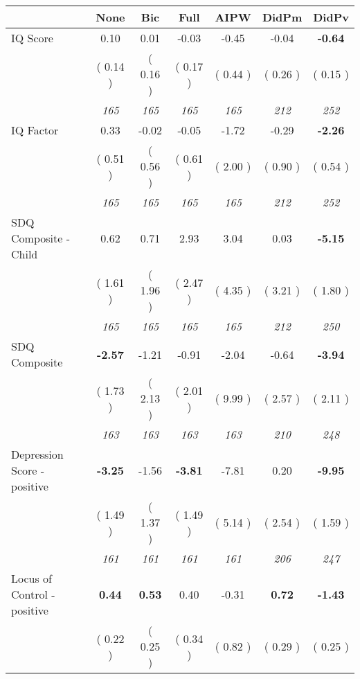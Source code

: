 \begin{tabular}{l c c c c c c}
\toprule
 & None & Bic & Full & AIPW & DidPm & DidPv \\
\midrule
IQ Score &      0.10 &      0.01 &     -0.03 &     -0.45 &     -0.04 & \textbf{     -0.64 } \\
& (     0.14 ) & (     0.16 ) & (     0.17 ) & (     0.44 ) & (     0.26 ) & (     0.15 ) \\
& \textit{ 165 } & \textit{ 165 } & \textit{ 165 } & \textit{ 165 } & \textit{ 212 } & \textit{ 252 } \\
IQ Factor &      0.33 &     -0.02 &     -0.05 &     -1.72 &     -0.29 & \textbf{     -2.26 } \\
& (     0.51 ) & (     0.56 ) & (     0.61 ) & (     2.00 ) & (     0.90 ) & (     0.54 ) \\
& \textit{ 165 } & \textit{ 165 } & \textit{ 165 } & \textit{ 165 } & \textit{ 212 } & \textit{ 252 } \\
SDQ Composite - Child &      0.62 &      0.71 &      2.93 &      3.04 &      0.03 & \textbf{     -5.15 } \\
& (     1.61 ) & (     1.96 ) & (     2.47 ) & (     4.35 ) & (     3.21 ) & (     1.80 ) \\
& \textit{ 165 } & \textit{ 165 } & \textit{ 165 } & \textit{ 165 } & \textit{ 212 } & \textit{ 250 } \\
SDQ Composite & \textbf{     -2.57 } &     -1.21 &     -0.91 &     -2.04 &     -0.64 & \textbf{     -3.94 } \\
& (     1.73 ) & (     2.13 ) & (     2.01 ) & (     9.99 ) & (     2.57 ) & (     2.11 ) \\
& \textit{ 163 } & \textit{ 163 } & \textit{ 163 } & \textit{ 163 } & \textit{ 210 } & \textit{ 248 } \\
Depression Score - positive & \textbf{     -3.25 } &     -1.56 & \textbf{     -3.81 } &     -7.81 &      0.20 & \textbf{     -9.95 } \\
& (     1.49 ) & (     1.37 ) & (     1.49 ) & (     5.14 ) & (     2.54 ) & (     1.59 ) \\
& \textit{ 161 } & \textit{ 161 } & \textit{ 161 } & \textit{ 161 } & \textit{ 206 } & \textit{ 247 } \\
Locus of Control - positive & \textbf{      0.44 } & \textbf{      0.53 } &      0.40 &     -0.31 & \textbf{      0.72 } & \textbf{     -1.43 } \\
& (     0.22 ) & (     0.25 ) & (     0.34 ) & (     0.82 ) & (     0.29 ) & (     0.25 ) \\

\end{tabular}
